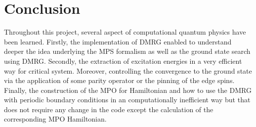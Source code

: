 \section{Conclusion}

	Throughout this project, several aspect of computational quantum physics have been learned. Firstly, the implementation of DMRG enabled to understand deeper the idea underlying the MPS formalism as well as the ground state search using DMRG. Secondly, the extraction of excitation energies in a very efficient way for critical system. Moreover, controlling the convergence to the ground state via the application of some parity operator or the pinning of the edge spins. Finally, the construction of the MPO for Hamiltonian and how to use the DMRG with periodic boundary conditions in an computationally inefficient way but that does not require any change in the code except the calculation of the corresponding MPO Hamiltonian.

	